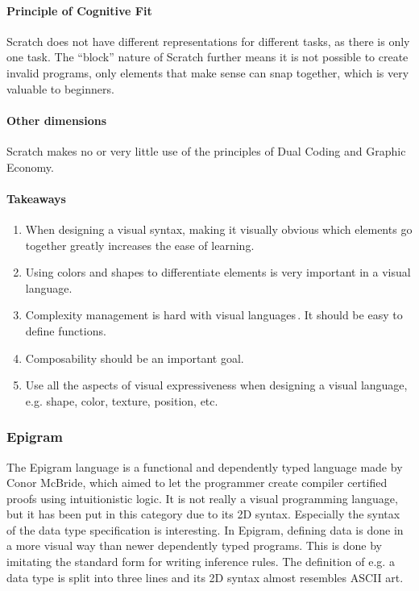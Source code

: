 \paragraph{Principle of Cognitive Fit}
Scratch does not have different representations for different tasks, as there is only one task. The ``block'' nature of Scratch further means it is not possible to create invalid programs, only elements that make sense can snap together, which is very valuable to beginners.

\paragraph{Other dimensions}
Scratch makes no or very little use of the principles of Dual Coding and Graphic Economy.

\paragraph{Takeaways}
\begin{enumerate}
	\item When designing a visual syntax, making it visually obvious which elements go together greatly increases the ease of learning.
	\item Using colors and shapes to differentiate elements is very important in a visual language.
	\item Complexity management is hard with visual languages\,\cite{green1992visual}. It should be easy to define functions.  
	\item Composability should be an important goal.
	\item Use all the aspects of visual expressiveness when designing a visual language, e.g. shape, color, texture, position, etc.
\end{enumerate}

\subsubsection{Epigram}
\label{subsub:Epigram}
The Epigram language is a functional and dependently typed language made by Conor McBride, which aimed to let the programmer create compiler certified proofs using intuitionistic logic. It is not really a visual programming language, but it has been put in this category due to its 2D syntax. Especially the syntax of the data type specification is interesting. In Epigram, defining data is done in a more visual way than newer dependently typed programs. This is done by imitating the standard form for writing inference rules. The definition of e.g. a data type is split into three lines and its 2D syntax almost resembles ASCII art. 

